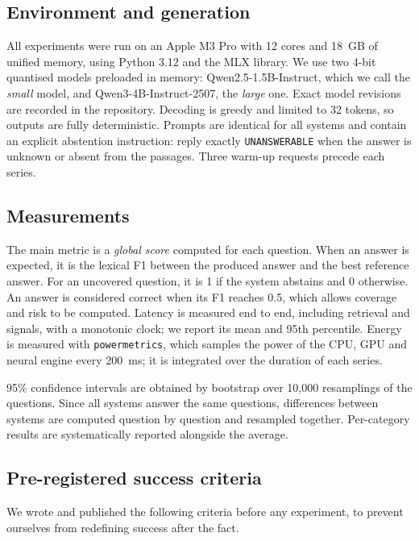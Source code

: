 \documentclass[11pt,a4paper]{article}
\begin{document}
\subsection{Environment and generation}

All experiments were run on an Apple M3 Pro with 12 cores and 18~GB of unified memory, using Python 3.12
and the MLX library. We use two 4-bit quantised models preloaded in memory: Qwen2.5-1.5B-Instruct, which
we call the \emph{small} model, and Qwen3-4B-Instruct-2507, the \emph{large} one. Exact model revisions
are recorded in the repository. Decoding is greedy and limited to 32 tokens, so outputs are fully
deterministic. Prompts are identical for all systems and contain an explicit abstention instruction:
reply exactly \texttt{UNANSWERABLE} when the answer is unknown or absent from the passages. Three
warm-up requests precede each series.

\subsection{Measurements}

The main metric is a \emph{global score} computed for each question. When an answer is expected, it is
the lexical F1 between the produced answer and the best reference answer. For an uncovered question, it
is 1 if the system abstains and 0 otherwise. An answer is considered correct when its F1 reaches 0.5,
which allows coverage and risk to be computed. Latency is measured end to end, including retrieval and
signals, with a monotonic clock; we report its mean and 95th percentile. Energy is measured with
\texttt{powermetrics}, which samples the power of the CPU, GPU and neural engine every 200~ms; it is
integrated over the duration of each series.

95\% confidence intervals are obtained by bootstrap over 10,000 resamplings of the questions. Since all
systems answer the same questions, differences between systems are computed question by question and
resampled together. Per-category results are systematically reported alongside the average.

\subsection{Pre-registered success criteria}

We wrote and published the following criteria before any experiment, to prevent ourselves from
redefining success after the fact.
\end{document}
